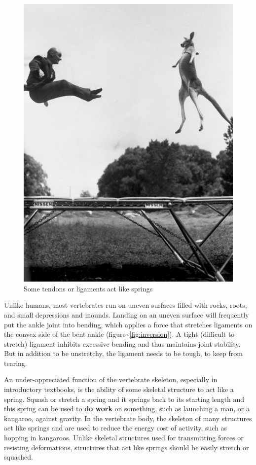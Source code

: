 \documentclass[]{book}
\begin{document}
\begin{figure}
\includegraphics[width=13.89in]{images/materials_chapter/trampoline} \caption{Some tendons or ligaments act like springs}\label{fig:unnamed-chunk-3}
\end{figure}

Unlike humans, most vertebrates run on uneven surfaces filled with
rocks, roots, and small depressions and mounds. Landing on an uneven
surface will frequently put the ankle joint into bending, which applies
a force that stretches ligaments on the convex side of the bent ankle
(figure\textasciitilde{}\ref{fig:inversion}). A tight (difficult to
stretch) ligament inhibits excessive bending and thus maintains joint
stability. But in addition to be unstretchy, the ligament needs to be
tough, to keep from tearing.

An under-appreciated function of the vertebrate skeleton, especially in
introductory textbooks, is the ability of some skeletal structure to act
like a spring. Squash or stretch a spring and it springs back to its
starting length and this spring can be used to \textbf{do work} on
something, such as launching a man, or a kangaroo, against gravity. In
the vertebrate body, the skeleton of many structures act like springs
and are used to reduce the energy cost of activity, such as hopping in
kangaroos. Unlike skeletal structures used for transmitting forces or
resisting deformations, structures that act like springs should be
easily stretch or squashed.
\end{document}
